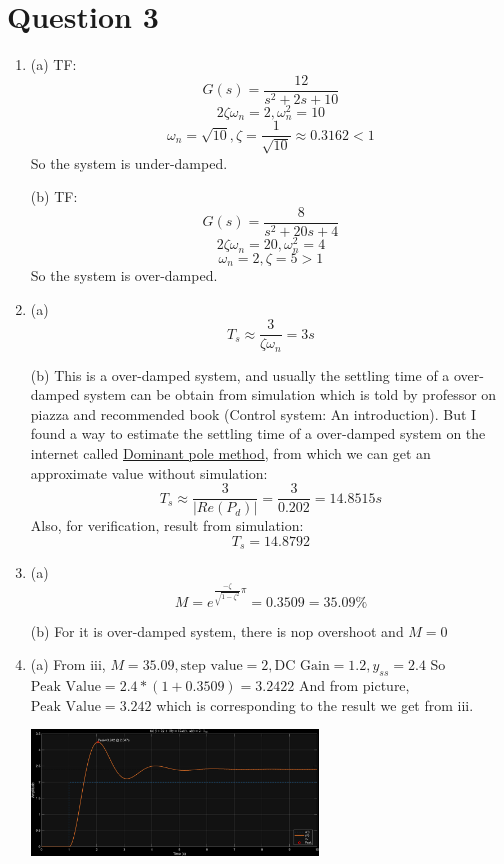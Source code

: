 \documentclass[12pt]{article}
\begin{document}
\section*{Question 3}
    \begin{enumerate}[label=\roman*.]
        \item (a) TF:
        \[G(s) = \frac{12}{s^2+2s+10}\]
        \[2\zeta\omega_n = 2, \omega_n^2 = 10\]
        \[\omega_n = \sqrt{10}, \zeta = \frac{1}{\sqrt{10}} \approx 0.3162 < 1\]
        So the system is under-damped.

        (b) TF:
        \[G(s) = \frac{8}{s^2+20s+4}\]
        \[2\zeta\omega_n = 20, \omega_n^2 = 4\]
        \[\omega_n = 2, \zeta = 5 > 1\]
        So the system is over-damped.

        \item (a)
        \[T_s \approx \frac{3}{\zeta\omega_n} = 3s\]

        (b)
        This is a over-damped system, and usually the settling time of a 
        over-damped system can be obtain from simulation which is told by 
        professor on piazza and recommended book (Control system: 
        An introduction). But I found a way to estimate the settling time of a
        over-damped system on the internet called
        \href{https://electronics.stackexchange.com/questions/511722/
        how-to-estimate-settling-time-of-an-overdamped-system}
        {Dominant pole method}, from which we can get an approximate value
        without simulation:
        \[T_s \approx \frac{3}{|Re(P_d)|} = \frac{3}{0.202} = 14.8515s\]
        Also, for verification, result from simulation:
        \[T_s = 14.8792\]

        \item (a)
        \[M = e^{\frac{-\zeta}{\sqrt{1-\zeta^2}}\pi} = 0.3509 = 35.09\%\]

        (b)
        For it is over-damped system, there is nop overshoot and $M = 0$

        \item (a) From iii, $M = 35.09, \text{step value} = 2, \text{DC Gain}
        =1.2, y_{ss} = 2.4$
        So $\text{Peak Value} = 2.4 * (1+0.3509) = 3.2422$
        And from picture, $\text{Peak Value} = 3.242$ which is corresponding to
        the result we get from iii.
        \begin{center}
            \includegraphics[width=0.6\textwidth]{Q3a.png}
        \end{center}


\end{enumerate}
\end{document}
